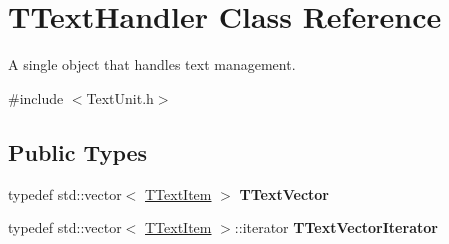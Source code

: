 \hypertarget{class_t_text_handler}{}\section{T\+Text\+Handler Class Reference}
\label{class_t_text_handler}


A single object that handles text management.  




{\ttfamily \#include $<$Text\+Unit.\+h$>$}

\subsection*{Public Types}
\begin{DoxyCompactItemize}
\item 
\mbox{\label{class_t_text_handler_a2538805e05af3522211884f3c2426e84}} 
typedef std\+::vector$<$ \mbox{\hyperlink{class_t_text_item}{T\+Text\+Item}} $>$ {\bfseries T\+Text\+Vector}
\item 
\mbox{\label{class_t_text_handler_a691b60d7ecb9bd6f8d8355467f3136e2}} 
typedef std\+::vector$<$ \mbox{\hyperlink{class_t_text_item}{T\+Text\+Item}} $>$\+::iterator {\bfseries T\+Text\+Vector\+Iterator}
\end{DoxyCompactItemize}
